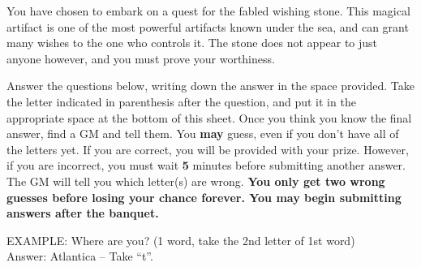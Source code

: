 \documentclass[green]{NeptuneBall}
\begin{document}
\name{\gWS{}}

You have chosen to embark on a quest for the fabled wishing stone. This magical artifact is one of the most powerful artifacts known under the sea, and can grant many wishes to the one who controls it. The stone does not appear to just anyone however, and you must prove your worthiness.

Answer the questions below, writing down the answer in the space provided. Take the letter indicated in parenthesis after the question, and put it in the appropriate space at the bottom of this sheet. Once you think you know the final answer, find a GM and tell them. You {\bf may} guess, even if you don't have all of the letters yet. If you are correct, you will be provided with your prize. However, if you are incorrect, you must wait {\bf 5} minutes before submitting another answer. The GM will tell you which letter(s) are wrong. {\bf You only get two wrong guesses before losing your chance forever. You may begin submitting answers after the banquet.}

EXAMPLE:
Where are you? (1 word, take the 2nd letter of 1st word)\\
Answer: Atlantica  -- Take ``t''.
		
\end{document}
